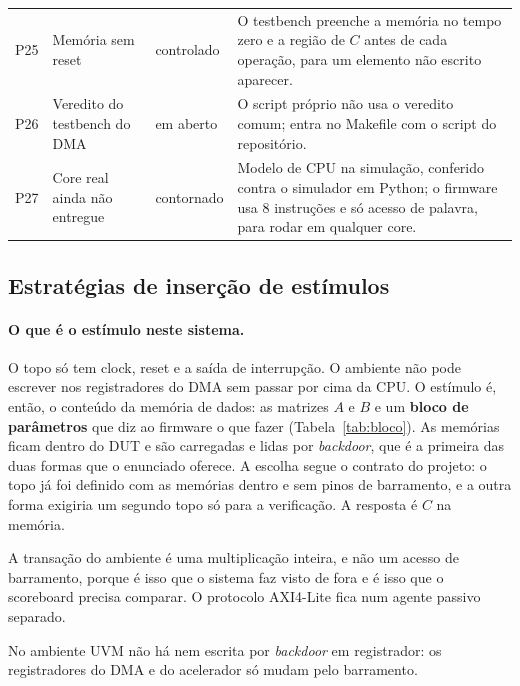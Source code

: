 \documentclass[10pt,a4paper]{article}
\newcommand{\code}[1]{\texttt{\detokenize{#1}}}
\begin{document}
{\begin{longtable}{@{}L{0.7cm}L{4.4cm}L{2.0cm}L{7.6cm}@{}}
P25 & Memória sem reset & controlado & O testbench preenche a memória no tempo zero e a região de
$C$ antes de cada operação, para um elemento não escrito aparecer.\\
P26 & Veredito do testbench do DMA & em aberto & O script próprio não usa o veredito comum; entra no
Makefile com o script do repositório.\\
P27 & Core real ainda não entregue & contornado & Modelo de CPU na simulação, conferido contra o
simulador em Python; o firmware usa 8 instruções e só acesso de palavra, para rodar em qualquer
core.\\
\end{longtable}}

\subsection{Estratégias de inserção de estímulos}
\label{sec:estimulo}

\paragraph{O que é o estímulo neste sistema.}
O topo só tem clock, reset e a saída de interrupção. O ambiente não pode escrever nos registradores
do DMA sem passar por cima da CPU. O estímulo é, então, o conteúdo da memória de dados: as matrizes
$A$ e $B$ e um \textbf{bloco de parâmetros} que diz ao firmware o que fazer
(Tabela~\ref{tab:bloco}). As memórias ficam dentro do DUT e são carregadas e lidas por
\emph{backdoor}, que é a primeira das duas formas que o enunciado oferece. A escolha segue o
contrato do projeto: o topo já foi definido com as memórias dentro e sem pinos de barramento, e a
outra forma exigiria um segundo topo só para a verificação. A resposta é $C$ na memória.

A transação do ambiente é uma multiplicação inteira, e não um acesso de barramento, porque é isso
que o sistema faz visto de fora e é isso que o scoreboard precisa comparar. O protocolo AXI4-Lite
fica num agente passivo separado.

No ambiente UVM não há \code{force} nem escrita por \emph{backdoor} em registrador: os
registradores do DMA e do acelerador só mudam pelo barramento.
\end{document}
